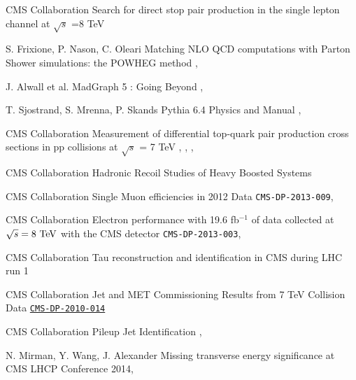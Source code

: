 {CMS Collaboration}
{Search for direct stop pair production in the single lepton channel at $\sqrt{s}$ =8 TeV}
{}


{S. Frixione, P. Nason, C. Oleari}
{Matching NLO QCD computations with Parton Shower simulations: the POWHEG method}
{, }

{J. Alwall et al.}
{MadGraph 5 : Going Beyond}
{, }

{T. Sjostrand, S. Mrenna, P. Skands}
{Pythia 6.4 Physics and Manual}
{, }

{CMS Collaboration}
{Measurement of differential top-quark pair production
cross sections in pp collisions at $\sqrt{s}$ = 7 TeV}
{, , , }

{CMS Collaboration}
{Hadronic Recoil Studies of Heavy Boosted Systems}
{}


{CMS Collaboration}
{Single Muon efficiencies in 2012 Data}
{\texttt{CMS-DP-2013-009}, }

{CMS Collaboration}
{Electron performance with 19.6 fb$^{-1}$ of data collected at $\sqrt{s}=8~\text{TeV}$ with the CMS detector}
{\texttt{CMS-DP-2013-003}, }

{CMS Collaboration}
{Tau reconstruction and identification in CMS during LHC run 1}
{}

{CMS Collaboration}
{Jet and MET Commissioning Results from 7 TeV Collision Data}
{\href{http://cms.cern.ch/iCMS/jsp/openfile.jsp?type=DP&year=2010&files=DP2010_014.pdf}{\texttt{CMS-DP-2010-014}}}

{CMS Collaboration}
{Pileup Jet Identification}
{, }


{N. Mirman, Y. Wang, J. Alexander}
{Missing transverse energy significance at CMS}
{LHCP Conference 2014, }

